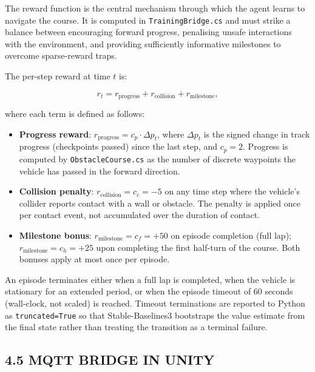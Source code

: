 \documentclass[12pt,a4paper]{article}
\begin{document}
\indent The reward function is the central mechanism through which the agent learns
to navigate the course. It is computed in \texttt{TrainingBridge.cs} and must
strike a balance between encouraging forward progress, penalising unsafe
interactions with the environment, and providing sufficiently informative
milestones to overcome sparse-reward traps.

The per-step reward at time $t$ is:

\begin{equation}
  r_t = r_{\text{progress}} + r_{\text{collision}} + r_{\text{milestone}},
  \label{eq:reward}
\end{equation}

\noindent where each term is defined as follows:

\begin{itemize}
  \item \textbf{Progress reward}: $r_{\text{progress}} = c_p \cdot \Delta p_t$,
    where $\Delta p_t$ is the signed change in track progress (checkpoints
    passed) since the last step, and $c_p = 2$. Progress is computed by
    \texttt{ObstacleCourse.cs} as the number of discrete waypoints the vehicle
    has passed in the forward direction.
  \item \textbf{Collision penalty}: $r_{\text{collision}} = c_c = -5$ on any
    time step where the vehicle's collider reports contact with a wall or
    obstacle. The penalty is applied once per contact event, not accumulated
    over the duration of contact.
  \item \textbf{Milestone bonus}: $r_{\text{milestone}} = c_f = +50$ on
    episode completion (full lap); $r_{\text{milestone}} = c_h = +25$ upon
    completing the first half-turn of the course. Both bonuses apply at most
    once per episode.
\end{itemize}

An episode terminates either when a full lap is completed, when the vehicle is
stationary for an extended period, or when the episode timeout of 60 seconds
(wall-clock, not scaled) is reached. Timeout terminations are reported to Python
as \texttt{truncated=True} so that Stable-Baselines3 bootstraps the value
estimate from the final state rather than treating the transition as a terminal
failure.

\subsection*{4.5 \quad MQTT BRIDGE IN UNITY}
\end{document}

